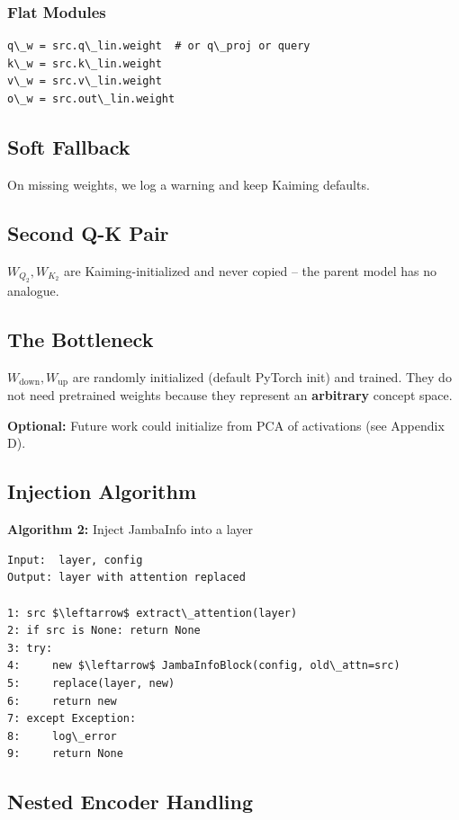 \subsubsection{Flat Modules}

\begin{lstlisting}
q\_w = src.q\_lin.weight  # or q\_proj or query
k\_w = src.k\_lin.weight
v\_w = src.v\_lin.weight
o\_w = src.out\_lin.weight
\end{lstlisting}

\subsection{Soft Fallback}

On missing weights, we log a warning and keep Kaiming defaults.

\subsection{Second Q-K Pair}

$W_{Q_2}, W_{K_2}$ are Kaiming-initialized and never copied -- the parent 
model has no analogue.

\subsection{The Bottleneck}

$W_\text{down}, W_\text{up}$ are randomly initialized (default PyTorch 
init) and trained. They do not need pretrained weights because they 
represent an \textbf{arbitrary} concept space.

\textbf{Optional:} Future work could initialize from PCA of activations (see 
Appendix D).

\subsection{Injection Algorithm}

\textbf{Algorithm 2:} Inject JambaInfo into a layer
\begin{lstlisting}
Input:  layer, config
Output: layer with attention replaced

1: src $\leftarrow$ extract\_attention(layer)
2: if src is None: return None
3: try:
4:     new $\leftarrow$ JambaInfoBlock(config, old\_attn=src)
5:     replace(layer, new)
6:     return new
7: except Exception:
8:     log\_error
9:     return None
\end{lstlisting}

\subsection{Nested Encoder Handling}


